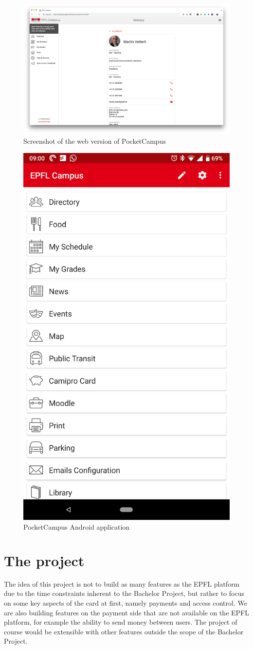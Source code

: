 \documentclass[11pt,a4paper]{report}
\begin{document}
\begin{figure}[H]
\begin{center}
	\includegraphics[width=.8\textwidth]{assets/web_pocketcampus.png}
	\caption{Screenshot of the web version of PocketCampus}
\end{center}
\end{figure}
\begin{figure}[H]
\begin{center}
	\includegraphics[width=.5\textwidth]{assets/pocketcampus_mobile.png}
	\caption{PocketCampus Android application}
\end{center}
\end{figure}

\chapter{The project}
The idea of this project is not to build as many features as the EPFL platform due to the time constraints inherent to the Bachelor Project, but rather to focus on some key aspects of the card at first, namely payments and access control. We are also building features on the payment side that are not available on the EPFL platform, for example the ability to send money between users. The project of course would be extensible with other features outside the scope of the Bachelor Project. \\
\end{document}
